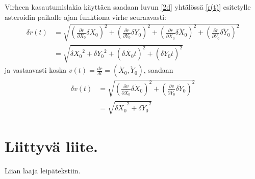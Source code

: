 \documentclass[12pt,a4paper,titlepage]{article}
\begin{document}
Virheen kasautumislakia käyttäen saadaan luvun \ref{2d} yhtälössä \ref{r(t)} esitetylle asteroidin paikalle ajan funktiona virhe seuraavasti:
\begin{align}
	\delta r(t) &= \sqrt{\left(\frac{\partial r}{\partial{X_0}} \delta X_0 \right)^2 + \left(\frac{\partial r}{\partial{Y_0}} \delta Y_0 \right)^2 + \left(\frac{\partial r}{\partial\dot{X_0}} \delta \dot X_0 \right)^2 + \left(\frac{\partial r}{\partial\dot{Y_0}} \delta \dot Y_0 \right)^2 } \nonumber\\
	 &= \sqrt{ \delta{X_0}^2 + \delta{Y_0}^2 + \left(\delta\dot{X_0}t\right)^2 + \left(\delta\dot{Y_0}t\right)^2}
\end{align}
ja vastaavasti koska $v(t) = \frac{dr}{dt} = (\dot X_0, \dot Y_0)$, saadaan
\begin{align}
	\delta v(t) &= \sqrt{\left(\frac{\partial v}{\partial\dot{X_0}} \delta \dot X_0 \right)^2 + \left(\frac{\partial v}{\partial\dot{Y_0}} \delta \dot Y_0 \right)^2 } \nonumber\\
	 &= \sqrt{ \delta\dot{X_0}^2 + \delta\dot{Y_0}^2}
\end{align}


\newpage

 
\appendix
\newpage
\section{Liittyvä liite.} \label{koodi}
Liian laaja leipätekstiin.
\end{document}

